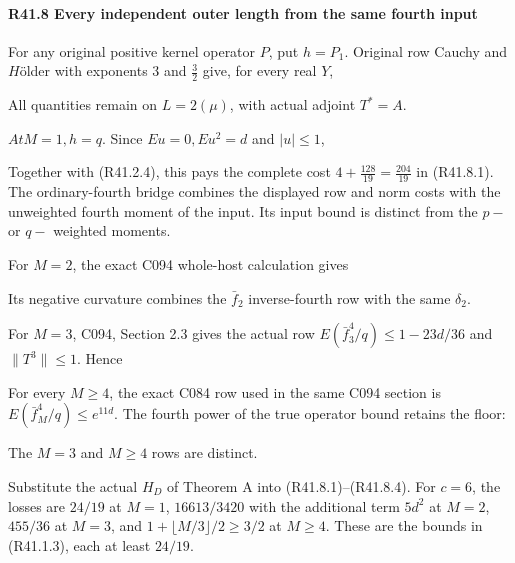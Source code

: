 \paragraph{R41.8 Every independent outer length from the same fourth input}

For any original positive kernel operator \(P\), put \(h=P_{1}\). Original row Cauchy and \(H\)ölder with exponents 3 and \(\frac{3}{2}\) give, for every real \(Y\),


All quantities remain on \(L=2(\mu)\), with actual adjoint \(T^*=A\).

\(At M=1,\allowbreak \allowbreak  h=q\). Since \(Eu=0,\allowbreak \allowbreak  Eu^2=d\) and \(\lvert u\rvert \le 1\),


Together with (R41.2.4), this pays the complete cost \(4+\frac{128}{19}=\frac{204}{19}\) in (R41.8.1). The ordinary-fourth bridge combines the displayed row and norm costs
with the unweighted fourth moment of the input. Its input bound is
distinct from the \(p-\) or \(q-\) weighted moments.

For \(M=2\), the exact C094 whole-host calculation gives


Its negative curvature combines the \(\bar f_{2}\) inverse-fourth row with the same \(\delta_2\).

For \(M=3\), C094, Section 2.3 gives the actual row \(E(\bar f_{3}^4/q)\le 1-23d/36\) and \(\lVert T^3\rVert \le 1\). Hence


For every \(M\ge 4\), the exact C084 row used in the same C094 section is \(E(\bar f_M^4/q)\le e^{11d}\). The fourth power of the true operator bound retains the floor:


The \(M=3\) and \(M\ge 4\) rows are distinct.

Substitute the actual \(H_D\) of Theorem A into
(R41.8.1)--(R41.8.4). For \(c=6\), the losses are
\(24/19\) at \(M=1\), \(16613/3420\) with the additional term
\(5d^2\) at \(M=2\), \(455/36\) at \(M=3\), and
\(1+\lfloor M/3\rfloor/2\ge3/2\) at \(M\ge4\).
These are the bounds in (R41.1.3), each at least \(24/19\).

